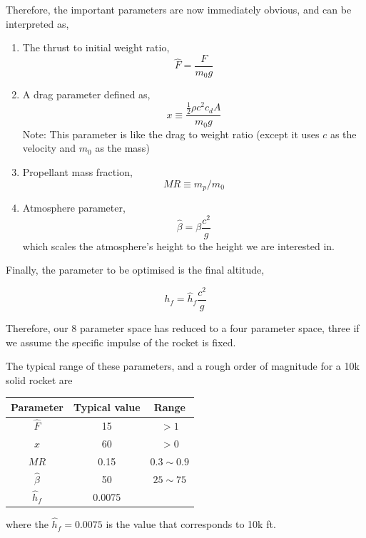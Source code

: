 \documentclass[12pt]{article}
\begin{document}
Therefore, the important parameters are now immediately obvious, and can be interpreted as,

\begin{enumerate}
\item The thrust to initial weight ratio, 
\begin{equation}
\hat F = \frac{F}{m_0 g}
\end{equation}

\item A drag parameter defined as,
\begin{equation}
x \equiv \frac{\frac{1}{2} \rho c^2 c_d A}{m_0 g}
\end{equation}
Note: This parameter is like the drag to weight ratio (except it uses $c$ as the velocity and $m_0$ as the mass)

\item Propellant mass fraction,
\begin{equation}
MR \equiv m_p/m_0
\end{equation}

\item Atmosphere parameter, 
\begin{equation}
\hat \beta = \beta \frac{c^2}{g}
\end{equation}
which scales the atmosphere's height to the height we are interested in. 
\end{enumerate}

Finally, the parameter to be optimised is the final altitude, 

\begin{equation}
h_f = \hat h_f \frac{c^2}{g}
\end{equation} 


Therefore, our 8 parameter space has reduced to a four parameter space, three if we assume the specific impulse of the rocket is fixed.

The typical range of these parameters, and a rough order of magnitude for a 10k solid rocket are

\begin{center}
   \begin{tabular}{@{} ccc@{}}
      \toprule
      Parameter & Typical value & Range\\
      \midrule
      $\hat F$ & 15 & $>1$\\
      $x$ & 60 & $>0$\\
      $MR$ & 0.15 & $0.3\sim0.9$\\
      $\hat \beta$ & 50 & $25 \sim 75$\\
      $\hat h_f$ & 0.0075 \\
      \bottomrule
   \end{tabular}
\end{center}
where the $\hat h_f = 0.0075$  is the value that corresponds to 10k ft. 
\end{document}
